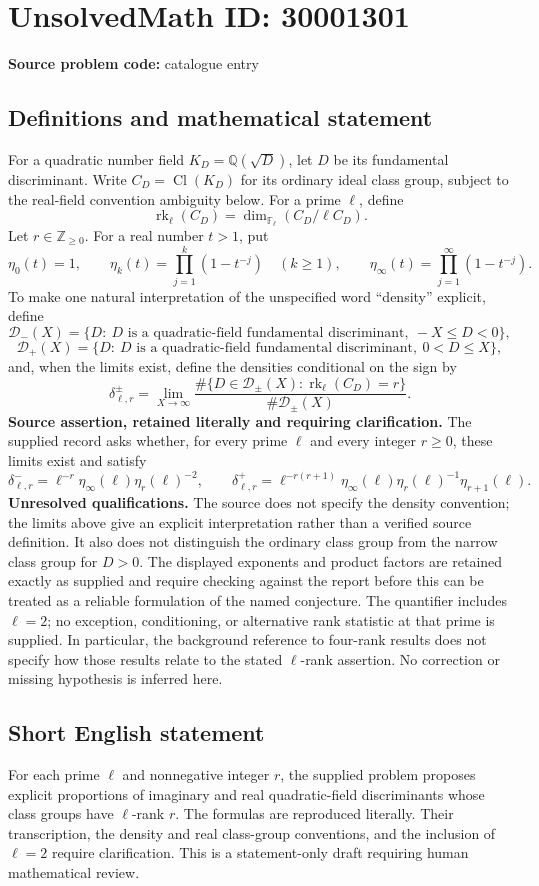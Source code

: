 \documentclass[11pt]{article}
\newcommand{\Z}{\mathbb{Z}}
\newcommand{\Q}{\mathbb{Q}}
\newcommand{\F}{\mathbb{F}}
\begin{document}
\section*{UnsolvedMath ID: 30001301}
\textbf{Source problem code:} catalogue entry
\subsection{Definitions and mathematical statement}
For a quadratic number field \(K_D=\Q(\sqrt D)\), let \(D\) be its fundamental discriminant. Write \(C_D=\operatorname{Cl}(K_D)\) for its ordinary ideal class group, subject to the real-field convention ambiguity below. For a prime \(\ell\), define
\[
\operatorname{rk}_{\ell}(C_D)=\dim_{\F_\ell}(C_D/\ell C_D).
\]
Let \(r\in\Z_{\geq0}\). For a real number \(t>1\), put
\[
\eta_0(t)=1,\qquad \eta_k(t)=\prod_{j=1}^{k}(1-t^{-j})\quad(k\geq1),\qquad
\eta_\infty(t)=\prod_{j=1}^{\infty}(1-t^{-j}).
\]
To make one natural interpretation of the unspecified word ``density'' explicit, define
\[
\mathcal D_-(X)=\{D:\ D\text{ is a quadratic-field fundamental discriminant},\ -X\leq D<0\},
\]
\[
\mathcal D_+(X)=\{D:\ D\text{ is a quadratic-field fundamental discriminant},\ 0<D\leq X\},
\]
and, when the limits exist, define the densities conditional on the sign by
\[
\delta_{\ell,r}^{\pm}=\lim_{X\to\infty}
\frac{\#\{D\in\mathcal D_\pm(X):\operatorname{rk}_{\ell}(C_D)=r\}}
{\#\mathcal D_\pm(X)}.
\]
\textbf{Source assertion, retained literally and requiring clarification.} The supplied record asks whether, for every prime \(\ell\) and every integer \(r\geq0\), these limits exist and satisfy
\[
\delta_{\ell,r}^{-}=\ell^{-r}\eta_\infty(\ell)\eta_r(\ell)^{-2},
\qquad
\delta_{\ell,r}^{+}=\ell^{-r(r+1)}\eta_\infty(\ell)\eta_r(\ell)^{-1}\eta_{r+1}(\ell).
\]
\textbf{Unresolved qualifications.} The source does not specify the density convention; the limits above give an explicit interpretation rather than a verified source definition. It also does not distinguish the ordinary class group from the narrow class group for \(D>0\). The displayed exponents and product factors are retained exactly as supplied and require checking against the report before this can be treated as a reliable formulation of the named conjecture. The quantifier includes \(\ell=2\); no exception, conditioning, or alternative rank statistic at that prime is supplied. In particular, the background reference to four-rank results does not specify how those results relate to the stated \(\ell\)-rank assertion. No correction or missing hypothesis is inferred here.
\subsection{Short English statement}
For each prime \(\ell\) and nonnegative integer \(r\), the supplied problem proposes explicit proportions of imaginary and real quadratic-field discriminants whose class groups have \(\ell\)-rank \(r\). The formulas are reproduced literally. Their transcription, the density and real class-group conventions, and the inclusion of \(\ell=2\) require clarification. This is a statement-only draft requiring human mathematical review.
\end{document}
